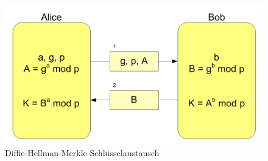 \documentclass[
  a4paper,
  11pt,
]{scrartcl}
\theoremstyle{plain}
\theoremstyle{definition}
\theoremstyle{remark}
\begin{document}
\begin{figure}[!htb]
  \centering
  \includegraphics[width=\textwidth]{Diffie-Hellman-Schluesselaustausch2.png}
  \caption{Diffie-Hellman-Merkle-Schlüsselaustausch}
  \label{fig:dhke}
\end{figure}
\end{document}
